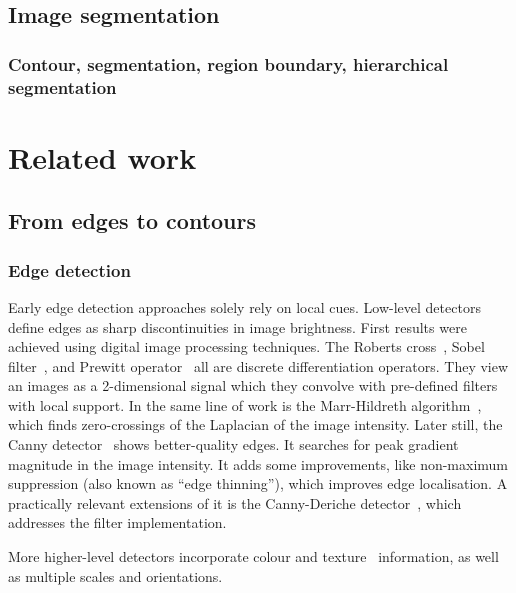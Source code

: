 \subsection{Image segmentation}

\subsubsection*{Contour, segmentation, region boundary, hierarchical segmentation}

\section{Related work}
\subsection{From edges to contours}
\subsubsection{Edge detection}
Early edge detection approaches solely rely on local cues. Low-level detectors define edges as sharp discontinuities in image brightness. First results were achieved using digital image processing techniques. The Roberts cross~\cite{roberts1963machine}, Sobel filter~\cite{sobel19683x3}, and Prewitt operator~\cite{prewitt1970object} all are discrete differentiation operators. %
They view an images as a 2-dimensional signal which they convolve with pre-defined filters with local support. In the same line of work is the Marr-Hildreth algorithm~\cite{marr1980theory}, which finds zero-crossings of the Laplacian of the image intensity. Later still, the Canny detector~\cite{canny1986computational} shows better-quality edges. It searches for peak gradient magnitude in the image intensity. It adds some improvements, like non-maximum suppression (also known as ``edge thinning''), which improves edge localisation. A practically relevant extensions of it is the Canny-Deriche detector~\cite{deriche1987using}, which addresses the filter implementation.

More higher-level detectors incorporate colour and texture~\cite{rubner1996coalescing,will2000learning} information, as well as multiple scales and orientations.

